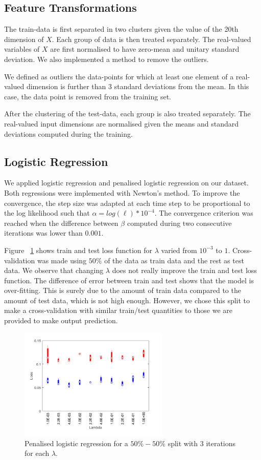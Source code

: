 \documentclass{article} %
\begin{document}
\subsection{Feature Transformations}
The train-data is first separated in two clusters given the value of the 20th dimension of $X$. Each group of data is then treated separately. The real-valued variables of $X$ are first normalised to have zero-mean and unitary standard deviation. We also implemented a method to remove the outliers.

We defined as outliers the data-points for which at least one element of a real-valued dimension is further than 3 standard deviations from the mean. In this case, the data point is removed from the training set. 

After the clustering of the test-data, each group is also treated separately. The real-valued input dimensions are normalised given the means and standard deviations computed during the training.

\subsection{Logistic Regression}
We applied logistic regression and penalised logistic regression on our dataset. Both regressions were implemented with Newton's method. To improve the convergence, the step size was adapted at each time step to be proportional to the log likelihood such that $\alpha = log(\ell) * 10^{-4}$. The convergence criterion was reached when the difference between $\beta$ computed during two consecutive iterations was lower than $0.001$.

Figure ~\ref{fig:class_penLogistic} shows train and test loss function for $\lambda$ varied from $10^{-3}$ to $1$. Cross-validation was made using $50\%$ of the data as train data and the rest as test data. We observe that changing $\lambda$ does not really improve the train and test loss function. The difference of error between train and test shows that the model is over-fitting. This is surely due to the amount of train data compared to the amount of test data, which is not high enough. However, we chose this split to make a cross-validation with similar train/test quantities to those we are provided to make output prediction.

\begin{figure}[!h] %
	\center
	\includegraphics[width=2.8in]{figures/lambdaLossBox.png}
	\caption{Penalised logistic regression for a $50 \% - 50\%$ split with 3 iterations for each $\lambda$.}
	\label{fig:class_penLogistic}
\end{figure}
\end{document}
